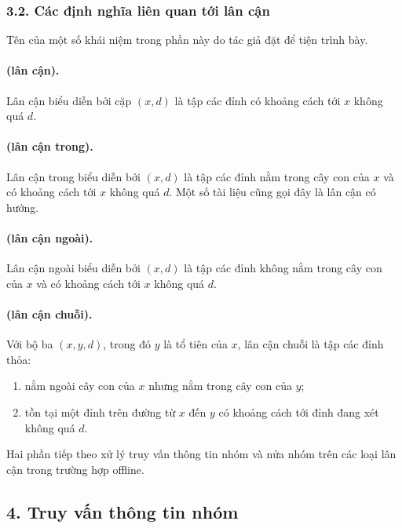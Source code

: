 \documentclass[11pt]{article}
\begin{document}
\subsubsection*{3.2. Các định nghĩa liên quan tới lân cận}

Tên của một số khái niệm trong phần này do tác giả đặt để tiện trình bày.

\paragraph{ (lân cận).}
Lân cận biểu diễn bởi cặp \((x,d)\) là tập các đỉnh có khoảng cách tới \(x\)
không quá \(d\).

\paragraph{ (lân cận trong).}
Lân cận trong biểu diễn bởi \((x,d)\) là tập các đỉnh nằm trong cây con của
\(x\) và có khoảng cách tới \(x\) không quá \(d\). Một số tài liệu cũng gọi đây
là lân cận có hướng.

\paragraph{ (lân cận ngoài).}
Lân cận ngoài biểu diễn bởi \((x,d)\) là tập các đỉnh không nằm trong cây con
của \(x\) và có khoảng cách tới \(x\) không quá \(d\).

\paragraph{ (lân cận chuỗi).}
Với bộ ba \((x,y,d)\), trong đó \(y\) là tổ tiên của \(x\), lân cận chuỗi là
tập các đỉnh thỏa:
\begin{enumerate}
  \item nằm ngoài cây con của \(x\) nhưng nằm trong cây con của \(y\);
  \item tồn tại một đỉnh trên đường từ \(x\) đến \(y\) có khoảng cách tới đỉnh
  đang xét không quá \(d\).
\end{enumerate}

Hai phần tiếp theo xử lý truy vấn thông tin nhóm và nửa nhóm trên các loại lân
cận trong trường hợp offline.

\subsection*{4. Truy vấn thông tin nhóm}
\end{document}
